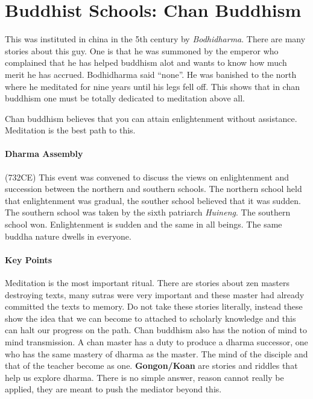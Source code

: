 \documentclass{article}
\begin{document}
\section*{Buddhist Schools: Chan Buddhism}
\label{sec:buddhist_schools_chan_buddhism}
This was instituted in china in the 5th century by \emph{Bodhidharma}. There are many stories about this guy. One is that he was summoned by the emperor who complained that he has helped buddhism alot and wants to know how much merit he has accrued. Bodhidharma said ``none''. He was banished to the north where he meditated for nine years until his legs fell off. This shows that in chan buddhism one must be totally dedicated to meditation above all.

Chan buddhism believes that you can attain enlightenment without assistance. Meditation is the best path to this.

\paragraph{Dharma Assembly}
\label{par:dharma_assembly}
(732CE) This event was convened to discuss the views on enlightenment and succession between the northern and southern schools. The northern school held that enlightenment was gradual, the souther school believed that it was sudden. The southern school was taken by the sixth patriarch \emph{Huineng}. The southern school won. Enlightenment is sudden and the same in all beings. The same buddha nature dwells in everyone.

\paragraph{Key Points}
\label{par:key_points}
Meditation is the most important ritual. There are stories about zen masters destroying texts, many sutras were very important and these master had already committed the texts to memory. Do not take these stories literally, instead these show the idea that we can become to attached to scholarly knowledge and this can halt our progress on the path. Chan buddhism also has the notion of mind to mind transmission. A chan master has a duty to produce a dharma successor, one who has the same mastery of dharma as the master. The mind of the disciple and that of the teacher become as one. \textbf{Gongon/Koan} are stories and riddles that help us explore dharma. There is no simple answer, reason cannot really be applied, they are meant to push the mediator beyond this.
\end{document}
